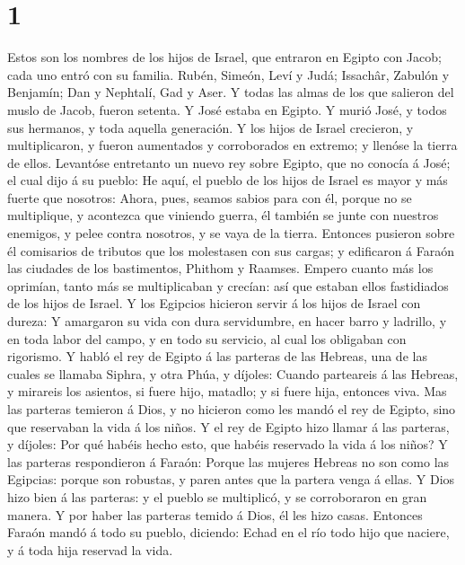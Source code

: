 \hypertarget{section}{%
\section{1}\label{section}}

 Estos son los nombres de los hijos de Israel, que
entraron en Egipto con Jacob; cada uno entró con su familia.
 Rubén, Simeón, Leví y Judá;  Issachâr,
Zabulón y Benjamín;  Dan y Nephtalí, Gad y Aser.
 Y todas las almas de los que salieron del muslo de Jacob,
fueron setenta. Y José estaba en Egipto.  Y murió José, y
todos sus hermanos, y toda aquella generación.  Y los
hijos de Israel crecieron, y multiplicaron, y fueron aumentados y
corroborados en extremo; y llenóse la tierra de ellos. 
Levantóse entretanto un nuevo rey sobre Egipto, que no conocía á José;
el cual dijo á su pueblo:  He aquí, el pueblo de los hijos
de Israel es mayor y más fuerte que nosotros:  Ahora,
pues, seamos sabios para con él, porque no se multiplique, y acontezca
que viniendo guerra, él también se junte con nuestros enemigos, y pelee
contra nosotros, y se vaya de la tierra.  Entonces
pusieron sobre él comisarios de tributos que los molestasen con sus
cargas; y edificaron á Faraón las ciudades de los bastimentos, Phithom y
Raamses.  Empero cuanto más los oprimían, tanto más se
multiplicaban y crecían: así que estaban ellos fastidiados de los hijos
de Israel.  Y los Egipcios hicieron servir á los hijos de
Israel con dureza:  Y amargaron su vida con dura
servidumbre, en hacer barro y ladrillo, y en toda labor del campo, y en
todo su servicio, al cual los obligaban con rigorismo.  Y
habló el rey de Egipto á las parteras de las Hebreas, una de las cuales
se llamaba Siphra, y otra Phúa, y díjoles:  Cuando
parteareis á las Hebreas, y mirareis los asientos, si fuere hijo,
matadlo; y si fuere hija, entonces viva.  Mas las
parteras temieron á Dios, y no hicieron como les mandó el rey de Egipto,
sino que reservaban la vida á los niños.  Y el rey de
Egipto hizo llamar á las parteras, y díjoles: Por qué habéis hecho esto,
que habéis reservado la vida á los niños?  Y las parteras
respondieron á Faraón: Porque las mujeres Hebreas no son como las
Egipcias: porque son robustas, y paren antes que la partera venga á
ellas.  Y Dios hizo bien á las parteras: y el pueblo se
multiplicó, y se corroboraron en gran manera.  Y por
haber las parteras temido á Dios, él les hizo casas. 
Entonces Faraón mandó á todo su pueblo, diciendo: Echad en el río todo
hijo que naciere, y á toda hija reservad la vida.

